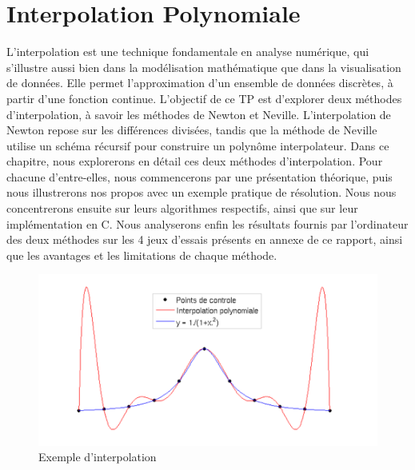 \chapter{Interpolation Polynomiale}
L'interpolation est une technique fondamentale en analyse numérique, qui s'illustre aussi bien dans la modélisation mathématique que dans la visualisation de données. Elle permet l'approximation d'un ensemble de données discrètes, à partir d'une fonction continue. L'objectif de ce TP est d'explorer deux méthodes d'interpolation, à savoir les méthodes de Newton et Neville. L'interpolation de Newton repose sur les différences divisées, tandis que la méthode de Neville utilise un schéma récursif pour construire un polynôme interpolateur. 
Dans ce chapitre, nous explorerons en détail ces deux méthodes d'interpolation. Pour chacune d'entre-elles, nous commencerons par une présentation théorique, puis nous illustrerons nos propos avec un exemple pratique de résolution. Nous nous concentrerons ensuite sur leurs algorithmes respectifs, ainsi que sur leur implémentation en C. Nous analyserons enfin les résultats fournis par l'ordinateur des deux méthodes sur les 4 jeux d'essais présents en annexe de ce rapport, ainsi que les avantages et les limitations de chaque méthode.
\begin{figure}[h]
    \centering
    \includegraphics[width=1\textwidth]{chapter/interpolation.png}
    \caption{Exemple d'interpolation}
\end{figure}
\newpage

